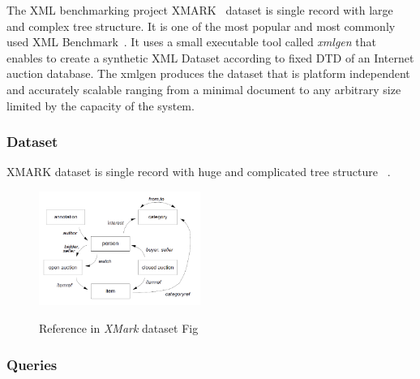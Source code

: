 The XML benchmarking project XMARK~\cite{xmark/original} dataset is single record with large and complex tree structure. It is one of the most popular and most commonly used XML Benchmark~\cite{xmark/mlynkova2008xml}. It uses a small executable tool called  \textit{xmlgen} that enables to create a synthetic XML Dataset according to fixed DTD of an Internet auction database. The xmlgen produces the dataset that is platform independent and accurately scalable ranging from a minimal document to any arbitrary size limited by the capacity of the system. 

\subsubsection{Dataset}
\label{xmark-dataset}
	XMARK dataset is single record with huge and complicated tree structure ~\cite{xml/VIST}. 

\begin{figure}
	\centering
	\includegraphics[width=0.47\textwidth]{img/xmark-references.png}{
		\label{xmark-reference}
	}
	\caption{Reference in \textit{XMark} dataset Fig~\cite{xmark/original}}
	\label{figParseProcess}
\end{figure}

\subsubsection{Queries}
\label{xmark-queries}
